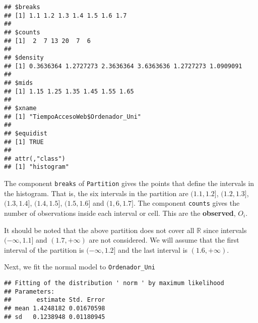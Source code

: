 \documentclass[
]{article}
\newenvironment{Shaded}{\begin{snugshade}}{\end{snugshade}}
\newcommand{\AttributeTok}[1]{\textcolor[rgb]{0.13,0.29,0.53}{#1}}
\newcommand{\ConstantTok}[1]{\textcolor[rgb]{0.56,0.35,0.01}{#1}}
\newcommand{\FunctionTok}[1]{\textcolor[rgb]{0.13,0.29,0.53}{\textbf{#1}}}
\newcommand{\NormalTok}[1]{#1}
\newcommand{\OtherTok}[1]{\textcolor[rgb]{0.56,0.35,0.01}{#1}}
\newcommand{\SpecialCharTok}[1]{\textcolor[rgb]{0.81,0.36,0.00}{\textbf{#1}}}
\newcommand{\StringTok}[1]{\textcolor[rgb]{0.31,0.60,0.02}{#1}}
\begin{document}
\begin{Shaded}
\end{Shaded}

\begin{verbatim}
## $breaks
## [1] 1.1 1.2 1.3 1.4 1.5 1.6 1.7
## 
## $counts
## [1]  2  7 13 20  7  6
## 
## $density
## [1] 0.3636364 1.2727273 2.3636364 3.6363636 1.2727273 1.0909091
## 
## $mids
## [1] 1.15 1.25 1.35 1.45 1.55 1.65
## 
## $xname
## [1] "TiempoAccesoWeb$Ordenador_Uni"
## 
## $equidist
## [1] TRUE
## 
## attr(,"class")
## [1] "histogram"
\end{verbatim}

The component \texttt{breaks} of \texttt{Partition} gives the points
that define the intervals in the histogram. That is, the six intervals
in the partition are \((1.1, 1.2]\), \((1.2, 1.3]\), \((1.3, 1.4]\),
\((1.4, 1.5]\), \((1.5, 1.6]\) and \((1,6, 1.7]\). The component
\texttt{counts} gives the number of observations inside each interval or
cell. This are the \textbf{observed}, \(O_i\).

It should be noted that the above partition does not cover all
\(\mathbb{R}\) since intervals \((-\infty, 1.1]\) and \((1.7, +\infty)\)
are not considered. We will assume that the first interval of the
partition is \((-\infty, 1.2]\) and the last interval is
\((1.6, +\infty)\).

Next, we fit the normal model to \texttt{Ordenador\_Uni}

\begin{Shaded}
\end{Shaded}

\begin{verbatim}
## Fitting of the distribution ' norm ' by maximum likelihood 
## Parameters:
##       estimate Std. Error
## mean 1.4248182 0.01670598
## sd   0.1238948 0.01180945
\end{verbatim}
\end{document}
